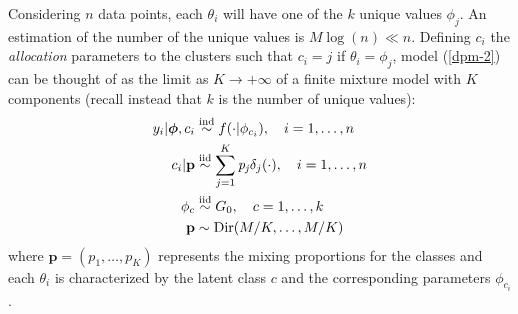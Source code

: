 Considering $n$ data points, each $\theta_i$ will have one of the $k$ unique values $\phi_{j}$.
An estimation of the number of the unique values is $M\log(n) \ll n$.
Defining  $c_i$ the \emph{allocation} parameters to the clusters such that $c_i = j$ if $\theta_i = \phi_j$, model (\ref{dpm-2}) can be thought of as the limit as $K \to +\infty$  of a finite mixture model with $K$ components (recall instead that $k$ is the number of unique values):
\begin{equation}
	\begin{aligned}\label{dpm-disc}
		y_{i}|\boldsymbol{\phi},c_{i} &\stackrel{\text{ind}}{\sim} f(\cdot|\phi_{c_{i}}), \quad i=1,\dots,n \\
		c_{i}|\mathit{\mathbf{p}}&\stackrel{\text{iid}}{\sim} \sum_{j=1}^K\mathit{p_j} \delta_j(\cdot), \quad i=1,\dots,n \\
		\phi_{c} & \stackrel{\text{iid}}{\sim} G_{0}, \quad c=1,\dots,k \\
		\mathbf{p} &\sim \operatorname{Dir}(M/K,\dots,M/K)
	\end{aligned}
\end{equation}
where $\mathbf{p}=(p_1,\dots,p_K)$ represents the mixing proportions for the classes and each $\theta_i$ is characterized by the latent class $c$ and the corresponding parameters $\phi_{c_i}$.

